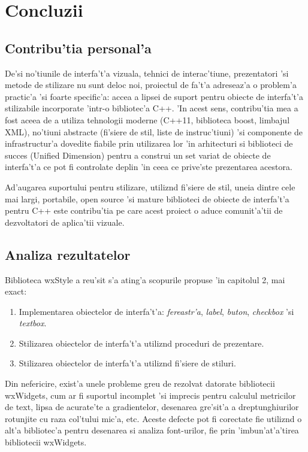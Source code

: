 \chapter{Concluzii}
\pagestyle{headings}

\section{Contribu'tia personal'a}

De'si no'tiunile de interfa't'a vizuala, tehnici de interac'tiune, prezentatori 'si metode de stilizare nu sunt deloc noi, proiectul de fa't'a adreseaz'a o problem'a practic'a 'si foarte specific'a: accea a lipsei de suport pentru obiecte de interfa't'a stilizabile incorporate 'intr-o bibliotec'a C++. 'In acest sens, contribu'tia mea a fost aceea de a utiliza tehnologii moderne (C++11, biblioteca boost, limbajul XML), no'tiuni abstracte (fi'siere de stil, liste de instruc'tiuni) 'si componente de infrastructur'a dovedite fiabile prin utilizarea lor 'in arhitecturi si biblioteci de succes (Unified Dimension) pentru a construi un set variat de obiecte de interfa't'a ce pot fi controlate deplin 'in ceea ce prive'ste prezentarea acestora.

\medskip

Ad'augarea suportului pentru stilizare, utiliz{\ia}nd fi'siere de stil, uneia dintre cele mai largi, portabile, open source 'si mature biblioteci de obiecte de interfa't'a pentru C++ este contribu'tia pe care acest proiect o aduce comunit'a'tii de dezvoltatori de aplica'tii vizuale.

\section{Analiza rezultatelor}

Biblioteca wxStyle a reu'sit s'a ating'a scopurile propuse 'in capitolul 2, mai exact:
\begin{enumerate}
\item Implementarea obiectelor de interfa't'a: \emph{fereastr'a}, \emph{label}, \emph{buton}, \emph{checkbox} 'si \emph{textbox}.
\item Stilizarea obiectelor de interfa't'a utiliz{\ia}nd proceduri de prezentare.
\item Stilizarea obiectelor de interfa't'a utiliz{\ia}nd fi'siere de stiluri.
\end{enumerate}

Din nefericire, exist'a unele probleme greu de rezolvat datorate bibliotecii wxWidgets, cum ar fi suportul incomplet 'si imprecis pentru calculul metricilor de text, lipsa de acurate'te a gradientelor, desenarea gre'sit'a a dreptunghiurilor rotunjite cu raza col'tului mic'a, etc. Aceste defecte pot fi corectate fie utiliz{\ia}nd o alt'a bibliotec'a pentru desenarea si analiza font-urilor, fie prin 'imbun'at'a'tirea bibliotecii wxWidgets.

